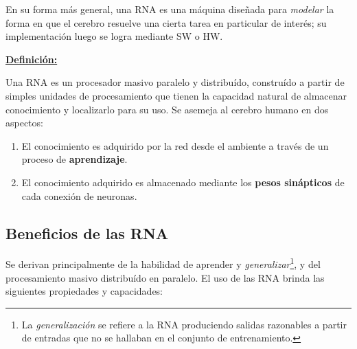 \documentclass[10pt,a4paper]{article}
\begin{document}
En su forma más general, una RNA es una máquina diseñada para \textit{modelar} la forma en que el cerebro resuelve una cierta tarea en particular de interés; su implementación luego se logra mediante SW o HW.

\underline{\textbf{Definición:}}

Una RNA es un procesador masivo paralelo y distribuído, construído a partir de simples unidades de procesamiento que tienen la capacidad natural de almacenar conocimiento y localizarlo para su uso. Se asemeja al cerebro humano en dos aspectos:

\begin{enumerate}
\item El conocimiento es adquirido por la red desde el ambiente a través de un proceso de \textbf{aprendizaje}.
\item El conocimiento adquirido es almacenado mediante los \textbf{pesos sinápticos} de cada conexión de neuronas.
\end{enumerate}

\subsection{Beneficios de las RNA}

Se derivan principalmente de la habilidad de aprender y \textit{generalizar}\footnote{La \textit{generalización} se refiere a la RNA produciendo salidas razonables a partir de entradas que no se hallaban en el conjunto de entrenamiento.}, y del procesamiento masivo distribuído en paralelo. El uso de las RNA brinda las siguientes propiedades y capacidades:
\end{document}
